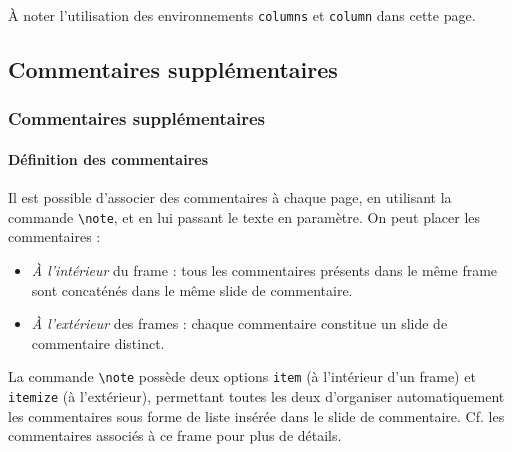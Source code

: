 \documentclass[10pt,    %
    french,             %
    xcolor=table,       %
    envcountsect,       %
    aspectratio=43      %
]{beamer}
\begin{document}
\begin{frame}
    
    
    \vspace{0.25cm}
    À noter l'utilisation des environnements \texttt{columns} et \texttt{column} dans cette page.
\end{frame}



\subsection{Commentaires supplémentaires}
\begin{frame}
    \frametitle{Commentaires supplémentaires}
    \framesubtitle{Définition des commentaires}
    
    Il est possible d'associer des commentaires à chaque page, en utilisant la commande \texttt{\textbackslash{}note}, et en lui passant le texte en paramètre. On peut placer les commentaires :
    \begin{itemize}
        \item \textit{À l'intérieur} du frame : tous les commentaires présents dans le même frame sont concaténés dans le même slide de commentaire.
        \item \textit{À l'extérieur} des frames : chaque commentaire constitue un slide de commentaire distinct.
    \end{itemize}
    
    \vspace{0.25cm}
    La commande \texttt{\textbackslash{}note} possède deux options \texttt{item} (à l'intérieur d'un frame) et \texttt{itemize} (à l'extérieur), permettant toutes les deux d'organiser automatiquement les commentaires sous forme de liste insérée dans le slide de commentaire. Cf. les commentaires associés à ce frame pour plus de détails.
\end{frame}
\end{document}
